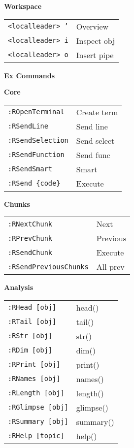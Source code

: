 \documentclass[10pt,a4paper]{article}
\begin{document}
\begin{multicols}{3}
\vspace{3pt}
\textbf{Workspace}\\
\begin{tabular}{@{}L{2.44cm}L{3.51cm}@{}}
\texttt{<localleader> '} & Overview \\
\texttt{<localleader> i} & Inspect obj \\
\texttt{<localleader> o} & Insert pipe \\
\end{tabular}

\columnbreak

\textbf{Ex Commands}

\textbf{Core}\\
\begin{tabular}{@{}L{2.93cm}L{2.54cm}@{}}
\texttt{:ROpenTerminal} & Create term \\
\texttt{:RSendLine} & Send line \\
\texttt{:RSendSelection} & Send select \\
\texttt{:RSendFunction} & Send func \\
\texttt{:RSendSmart} & Smart \\
\texttt{:RSend \{code\}} & Execute \\
\end{tabular}

\vspace{3pt}
\textbf{Chunks}\\
\begin{tabular}{@{}L{2.93cm}L{2.54cm}@{}}
\texttt{:RNextChunk} & Next \\
\texttt{:RPrevChunk} & Previous \\
\texttt{:RSendChunk} & Execute \\
\texttt{:RSendPreviousChunks} & All prev \\
\end{tabular}

\vspace{3pt}
\textbf{Analysis}\\
\begin{tabular}{@{}L{2.93cm}L{2.54cm}@{}}
\texttt{:RHead [obj]} & head() \\
\texttt{:RTail [obj]} & tail() \\
\texttt{:RStr [obj]} & str() \\
\texttt{:RDim [obj]} & dim() \\
\texttt{:RPrint [obj]} & print() \\
\texttt{:RNames [obj]} & names() \\
\texttt{:RLength [obj]} & length() \\
\texttt{:RGlimpse [obj]} & glimpse() \\
\texttt{:RSummary [obj]} & summary() \\
\texttt{:RHelp [topic]} & help() \\
\end{tabular}


\end{multicols}
\end{document}

